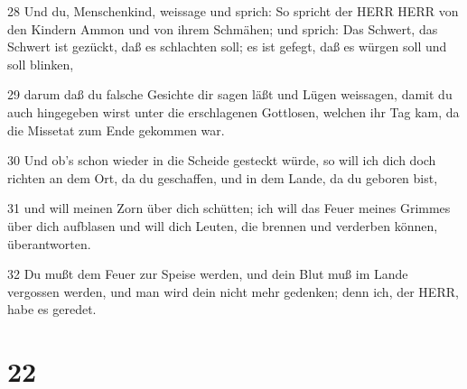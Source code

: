 \par 28 Und du, Menschenkind, weissage und sprich: So spricht der HERR HERR von den Kindern Ammon und von ihrem Schmähen; und sprich: Das Schwert, das Schwert ist gezückt, daß es schlachten soll; es ist gefegt, daß es würgen soll und soll blinken,
\par 29 darum daß du falsche Gesichte dir sagen läßt und Lügen weissagen, damit du auch hingegeben wirst unter die erschlagenen Gottlosen, welchen ihr Tag kam, da die Missetat zum Ende gekommen war.
\par 30 Und ob's schon wieder in die Scheide gesteckt würde, so will ich dich doch richten an dem Ort, da du geschaffen, und in dem Lande, da du geboren bist,
\par 31 und will meinen Zorn über dich schütten; ich will das Feuer meines Grimmes über dich aufblasen und will dich Leuten, die brennen und verderben können, überantworten.
\par 32 Du mußt dem Feuer zur Speise werden, und dein Blut muß im Lande vergossen werden, und man wird dein nicht mehr gedenken; denn ich, der HERR, habe es geredet.

\chapter{22}

